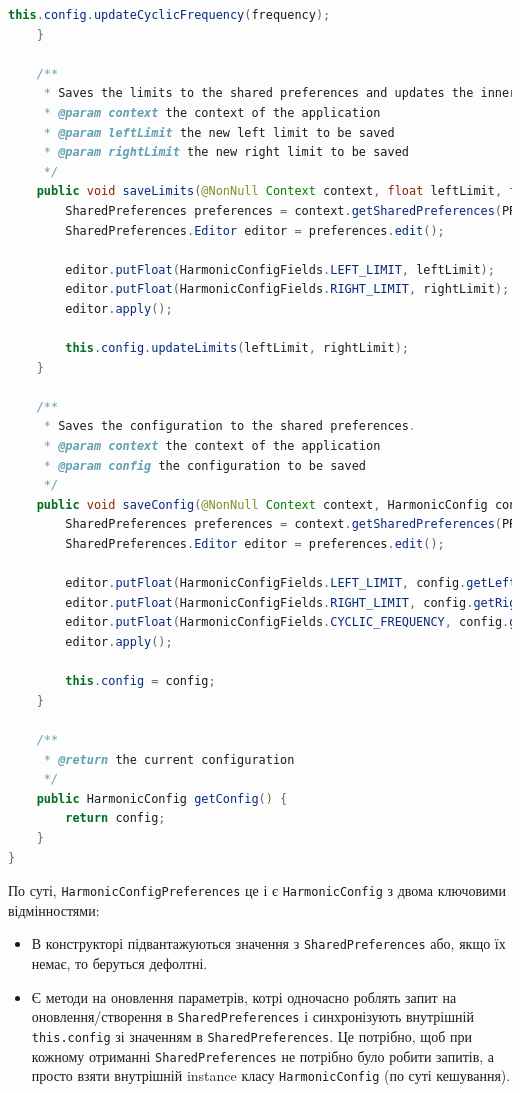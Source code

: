 \documentclass[oneside,solution]{android-assign}
\begin{document}
\begin{lstlisting}[language=java]
        this.config.updateCyclicFrequency(frequency);
    }

    /**
     * Saves the limits to the shared preferences and updates the inner configuration.
     * @param context the context of the application
     * @param leftLimit the new left limit to be saved
     * @param rightLimit the new right limit to be saved
     */
    public void saveLimits(@NonNull Context context, float leftLimit, float rightLimit) {
        SharedPreferences preferences = context.getSharedPreferences(PREFERENCES_NAME, Context.MODE_PRIVATE);
        SharedPreferences.Editor editor = preferences.edit();

        editor.putFloat(HarmonicConfigFields.LEFT_LIMIT, leftLimit);
        editor.putFloat(HarmonicConfigFields.RIGHT_LIMIT, rightLimit);
        editor.apply();

        this.config.updateLimits(leftLimit, rightLimit);
    }

    /**
     * Saves the configuration to the shared preferences.
     * @param context the context of the application
     * @param config the configuration to be saved
     */
    public void saveConfig(@NonNull Context context, HarmonicConfig config) {
        SharedPreferences preferences = context.getSharedPreferences(PREFERENCES_NAME, Context.MODE_PRIVATE);
        SharedPreferences.Editor editor = preferences.edit();

        editor.putFloat(HarmonicConfigFields.LEFT_LIMIT, config.getLeftLimit());
        editor.putFloat(HarmonicConfigFields.RIGHT_LIMIT, config.getRightLimit());
        editor.putFloat(HarmonicConfigFields.CYCLIC_FREQUENCY, config.getCyclicFrequency());
        editor.apply();

        this.config = config;
    }

    /**
     * @return the current configuration
     */
    public HarmonicConfig getConfig() {
        return config;
    }
}
\end{lstlisting}

По суті, \texttt{HarmonicConfigPreferences} це і є \texttt{HarmonicConfig} з двома ключовими відмінностями:
\begin{itemize}
    \item В конструкторі підвантажуються значення з \texttt{SharedPreferences} або, якщо їх немає, то беруться дефолтні.
    \item Є методи на оновлення параметрів, котрі одночасно роблять запит на оновлення/створення в \texttt{SharedPreferences} і синхронізують внутрішній \texttt{this.config} зі значенням в \texttt{SharedPreferences}. Це потрібно, щоб при кожному отриманні \texttt{SharedPreferences} не потрібно було робити запитів, а просто взяти внутрішній instance класу \texttt{HarmonicConfig} (по суті кешування).
\end{itemize}
\end{document}
